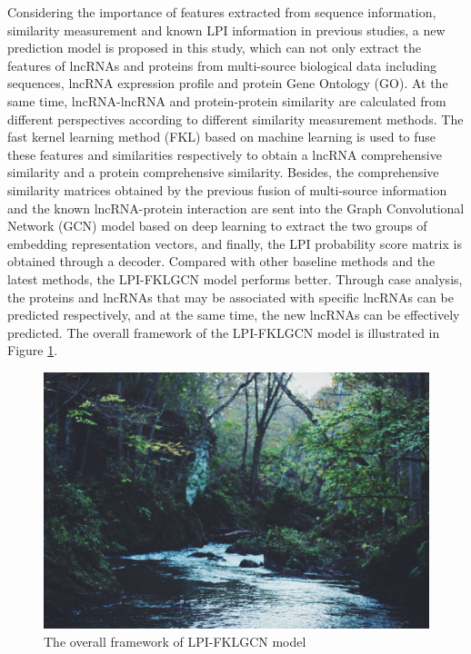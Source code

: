 \documentclass[fleqn,10pt]{wlscirep}
\begin{document}
Considering the importance of features extracted from sequence information, similarity measurement and known LPI information in previous studies, a new prediction model is proposed in this study, which can not only extract the features of lncRNAs and proteins from multi-source biological data including sequences, lncRNA expression profile and protein Gene Ontology (GO). At the same time, lncRNA-lncRNA and protein-protein similarity are calculated from different perspectives according to different similarity measurement methods. The fast kernel learning method (FKL) based on machine learning is used to fuse these features and similarities respectively to obtain a lncRNA comprehensive similarity and a protein comprehensive similarity. Besides, the comprehensive similarity matrices obtained by the previous fusion of multi-source information and the known lncRNA-protein interaction are sent into the Graph Convolutional Network (GCN) model based on deep learning to extract the two groups of embedding representation vectors, and finally, the LPI probability score matrix is obtained through a decoder. Compared with other baseline methods and the latest methods, the LPI-FKLGCN model performs better. Through case analysis, the proteins and lncRNAs that may be associated with specific lncRNAs can be predicted respectively, and at the same time, the new lncRNAs can be effectively predicted. The overall framework of the LPI-FKLGCN model is illustrated in Figure \ref{fig:fig1}.

\begin{figure}[ht]
\centering
\graphicspath{ {./images/} }
\includegraphics[width=\textwidth]{stream.jpg}
\caption{The overall framework of LPI-FKLGCN model}
\label{fig:fig1}
\end{figure}
\end{document}
